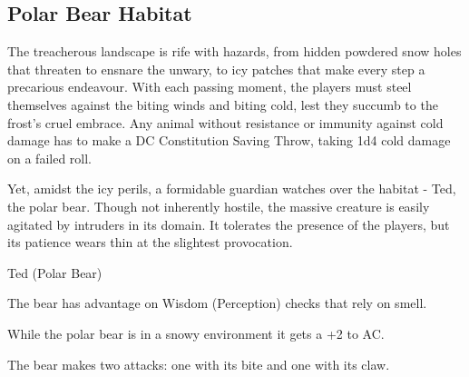 \subsection*{ Polar Bear Habitat}
The treacherous landscape is rife with hazards, from hidden powdered snow holes that threaten to ensnare the unwary, to icy patches that make every step a precarious endeavour. With each passing moment, the players must steel themselves against the biting winds and biting cold, lest they succumb to the frost's cruel embrace. Any animal without resistance or immunity against cold damage has to make a DC Constitution Saving Throw, taking 1d4 cold damage on a failed roll.

Yet, amidst the icy perils, a formidable guardian watches over the habitat - Ted, the polar bear. Though not inherently hostile, the massive creature is easily agitated by intruders in its domain. It tolerates the presence of the players, but its patience wears thin at the slightest provocation.
\begin{DndMonster}[width=0.5\textwidth]{Ted (Polar Bear)}

	\DndMonsterBasics[
		armor-class = {14 (Natural Armor)},
		hit-points  = {\DndDice{8d10 + 24}},
		speed       = {40 ft., swim 30 ft.},
	]

	\renewcommand{\AbilityScoreSpacer}{~}

	\DndMonsterAbilityScores[
		str = 20,
		dex = 10,
		con = 16,
		int = 2,
		wis = 13,
		cha = 7,
	]

	\DndMonsterDetails[
		skills = {Perception +3},
		damage-resistances = {cold},
		senses = {passive Perception 13},
		languages = {Common},
		challenge = 5,
	]

	The bear has advantage on Wisdom (Perception) checks that rely on smell.

	While the polar bear is in a snowy environment it gets a +2 to AC.
	
	The bear makes two attacks: one with its bite and one with its claw.   

	\DndMonsterAttack[
		name=Bite,
		distance=melee, %
		mod=+7,
		reach=5,
		targets=one target,
		dmg={\DndDice{1d8 + 5}},
		dmg-type=piercing,
	]
	
	\DndMonsterAttack[
		name=Claws,
		distance=melee, %
		mod=+7,
		reach=5,
		targets=one target,
		dmg={\DndDice{2d6 + 5}},
		dmg-type=slashing,
	] 
\end{DndMonster}
